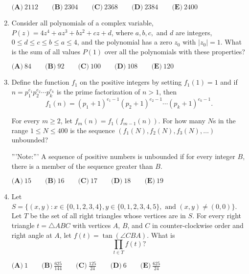 \documentclass{article}
\begin{document}
\begin{enumerate}[label=\arabic*., itemsep=0.5em]
\(\textbf{(A)}\ 2112\qquad\textbf{(B)}\ 2304\qquad\textbf{(C)}\ 2368\qquad\textbf{(D)}\ 2384\qquad\textbf{(E)}\ 2400\)\par \vspace{0.5em}\item Consider all polynomials of a complex variable, \(P(z)=4z^4+az^3+bz^2+cz+d\), where \(a,b,c,\) and \(d\) are integers, \(0\le d\le c\le b\le a\le 4\), and the polynomial has a zero \(z_0\) with \(|z_0|=1.\) What is the sum of all values \(P(1)\) over all the polynomials with these properties?

\(\textbf{(A)}\ 84\qquad\textbf{(B)}\ 92\qquad\textbf{(C)}\ 100\qquad\textbf{(D)}\ 108\qquad\textbf{(E)}\ 120 \)\par \vspace{0.5em}\item Define the function \(f_1\) on the positive integers by setting \(f_1(1)=1\) and if \(n=p_1^{e_1}p_2^{e_2}\cdots p_k^{e_k}\) is the prime factorization of \(n>1\), then 
\begin{equation*}
f_1(n)=(p_1+1)^{e_1-1}(p_2+1)^{e_2-1}\cdots (p_k+1)^{e_k-1}.
\end{equation*}

For every \(m\ge 2\), let \(f_m(n)=f_1(f_{m-1}(n))\). For how many \(N\)s in the range \(1\le N\le 400\) is the sequence \((f_1(N),f_2(N),f_3(N),\dots )\) unbounded?

'''Note:''' A sequence of positive numbers is unbounded if for every integer \(B\), there is a member of the sequence greater than \(B\).

\(\textbf{(A)}\ 15\qquad\textbf{(B)}\ 16\qquad\textbf{(C)}\ 17\qquad\textbf{(D)}\ 18\qquad\textbf{(E)}\ 19 \)\par \vspace{0.5em}\item Let \(S=\{(x,y) : x\in \{0,1,2,3,4\}, y\in \{0,1,2,3,4,5\},\text{ and } (x,y)\ne (0,0)\}\). 
Let \(T\) be the set of all right triangles whose vertices are in \(S\). For every right triangle \(t=\triangle{ABC}\) with vertices \(A\), \(B\), and \(C\) in counter-clockwise order and right angle at \(A\), let \(f(t)=\tan(\angle{CBA})\). What is 
\begin{equation*}
\prod_{t\in T} f(t)?
\end{equation*}


\(\textbf{(A)}\ 1\qquad\textbf{(B)}\ \frac{625}{144}\qquad\textbf{(C)}\ \frac{125}{24}\qquad\textbf{(D)}\ 6\qquad\textbf{(E)}\ \frac{625}{24} \)\par \vspace{0.5em}
\end{enumerate}
\end{document}

